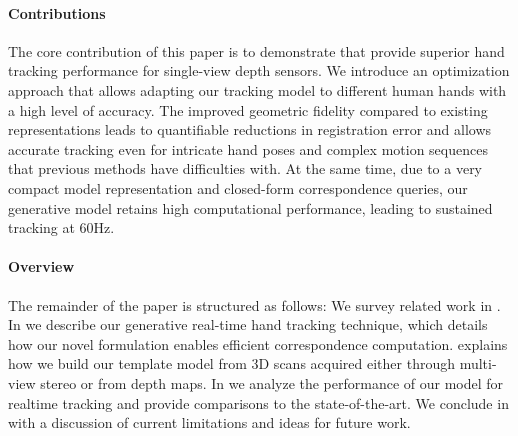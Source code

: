 \paragraph{Contributions}
%
The core contribution of this paper is to demonstrate that  provide superior hand tracking performance for single-view depth sensors. 
We introduce an optimization approach that allows adapting our tracking model to different human hands with a high level of accuracy. 
The improved geometric fidelity compared to existing representations leads to quantifiable reductions in registration error and allows accurate tracking even for intricate hand poses and complex motion sequences that previous methods have difficulties with. 
At the same time, due to a very compact model representation and closed-form correspondence queries, our generative model retains high computational performance, leading to sustained tracking at 60Hz.

\paragraph{Overview}
The remainder of the paper is structured as follows: We survey related work in . In  we describe our generative real-time hand tracking technique, which details how our novel formulation enables efficient correspondence computation.
% 
 explains how we build our template model from 3D scans acquired either through multi-view stereo or from depth maps.
% 
In  we analyze the performance of our model for realtime tracking and provide comparisons to the state-of-the-art. 
% 
We conclude in  with a discussion of current limitations and ideas for future work.


